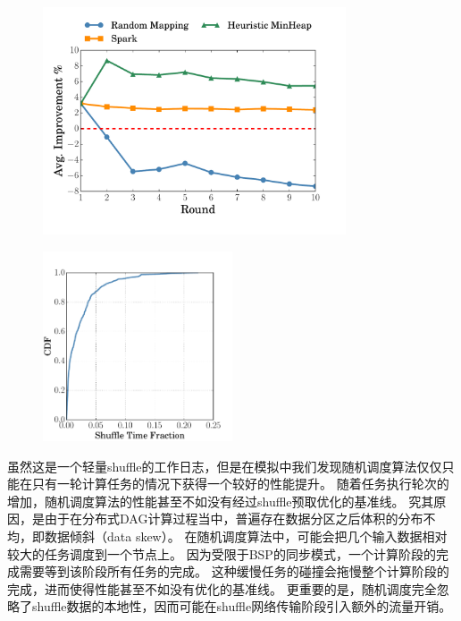 \begin{figure}[!htp]
    \centering
	\includegraphics[width=0.8\textwidth]{../../PPoPP-2018/fig/sim.pdf}
\end{figure}

\begin{figure}[!htp]
    \centering
	\includegraphics[width=0.5\textwidth]{../../PPoPP-2018/fig/reduce_cdf.pdf}
\end{figure}

虽然这是一个轻量shuffle的工作日志，但是在模拟中我们发现随机调度算法仅仅只能在只有一轮计算任务的情况下获得一个较好的性能提升。
随着任务执行轮次的增加，随机调度算法的性能甚至不如没有经过shuffle预取优化的基准线。
究其原因，是由于在分布式DAG计算过程当中，普遍存在数据分区之后体积的分布不均，即数据倾斜（data skew）\cite{reining, gufler2012load, skewtune}。
在随机调度算法中，可能会把几个输入数据相对较大的任务调度到一个节点上。
因为受限于BSP的同步模式，一个计算阶段的完成需要等到该阶段所有任务的完成。
这种缓慢任务的碰撞会拖慢整个计算阶段的完成，进而使得性能甚至不如没有优化的基准线。
更重要的是，随机调度完全忽略了shuffle数据的本地性，因而可能在shuffle网络传输阶段引入额外的流量开销。

